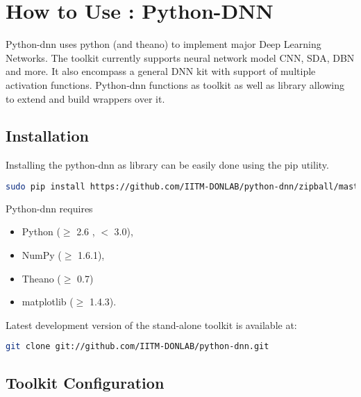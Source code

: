 \appendix
\label{app:pydnn}
\chapter{How to Use : Python-DNN}
Python-dnn uses python (and theano) to implement major Deep Learning Networks. The toolkit currently supports neural network model CNN, SDA, DBN and more. It also encompass a  general DNN  kit with support of multiple activation functions. Python-dnn functions as toolkit as well as library allowing to extend and build wrappers over it.
\section{Installation}
Installing  the python-dnn as library can be easily done using the pip utility.
\begin{lstlisting}[language=bash,basicstyle=\small] 
sudo pip install https://github.com/IITM-DONLAB/python-dnn/zipball/master
\end{lstlisting}
Python-dnn requires 
\begin{itemize}
	\item Python ($\geq$ 2.6 , $<$ 3.0),
	\item NumPy ($\geq$ 1.6.1),
	\item Theano ($\geq$ 0.7)
	\item matplotlib ($\geq$ 1.4.3).
\end{itemize}
\noindent Latest development version of the stand-alone toolkit is available at:
\begin{lstlisting}[language=bash,basicstyle=\small] 
git clone git://github.com/IITM-DONLAB/python-dnn.git
\end{lstlisting}

\section{Toolkit Configuration} 
